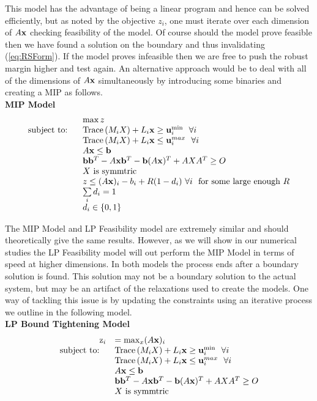 This model has the advantage of being a linear program and hence can be solved efficiently, but as noted by the objective $z_i$, one must iterate over each dimension of $A\mathbf{x}$ checking feasibility of the model. 
Of course should the model prove feasible then we have found a solution on the boundary and thus invalidating (\cref{eq:RSForm}). 
If the model proves infeasible then we are free to push the robust margin higher and test again. 
An alternative approach would be to deal with all of the dimensions of $A\mathbf{x}$ simultaneously by introducing some binaries and creating a MIP as follows. \\

\textbf{MIP Model}\
\begin{equation}\label{eq:OPTfeasrelaxLP2}
\begin{array}{rl}
 & \max z  \\
 \text{subject to: } \ &\operatorname{Trace}\left(M_iX\right)+ L_i\mathbf{x} \geq \mathbf{u}_i^{\min}  \ \ \forall i\\
 & \operatorname{Trace}\left(M_iX\right)+ L_i\mathbf{x} \leq \mathbf{u}_i^{max}  \ \ \forall i\\
 	&A\mathbf{x}\leq \mathbf{b} \\
 	&\mathbf{b}\mathbf{b}^T-A\mathbf{x}\mathbf{b}^T-\mathbf{b}(A\mathbf{x})^T+AXA^T\geq O \\
 	&X \text{ is symmtric} \\
 	& z\leq (A\mathbf{x})_i-b_i+R(1-d_i) \ \forall i \ \text{ for some large enough $R$} \\
 	& \sum\limits_i d_i=1 \\
 	& d_i\in\{0,1\}
\end{array}
\end{equation}


The MIP Model and LP Feasibility model are extremely similar and should theoretically give the same results. 
However, as we will show in our numerical studies the LP Feasibility model will out perform the MIP Model in terms of speed at higher dimensions. 
In both models the process ends after a boundary solution is found. 
This solution may not be a boundary solution to the actual system, but may be an artifact of the relaxations used to create the models. 
One way of tackling this issue is by updating the constraints using an iterative process we outline in the following model.\\

\textbf{LP Bound Tightening Model}
\begin{equation}\label{eq:OPTfeasrelaxLP3}
\begin{array}{rl}
\mathrm{z}_{i} &  = \max_x (A\mathbf{x})_i  \\
 \text{subject to: } \ &\operatorname{Trace}\left(M_iX\right)+ L_i\mathbf{x} \geq \mathbf{u}_i^{\min}  \ \ \forall i\\
 & \operatorname{Trace}\left(M_iX\right)+ L_i\mathbf{x} \leq \mathbf{u}_i^{max}  \ \ \forall i\\
 	&A\mathbf{x}\leq \mathbf{b} \\
 	&\mathbf{b}\mathbf{b}^T-A\mathbf{x}\mathbf{b}^T-\mathbf{b}(A\mathbf{x})^T+AXA^T\geq O \\
 	&X \text{ is symmtric}
\end{array}
\end{equation}


